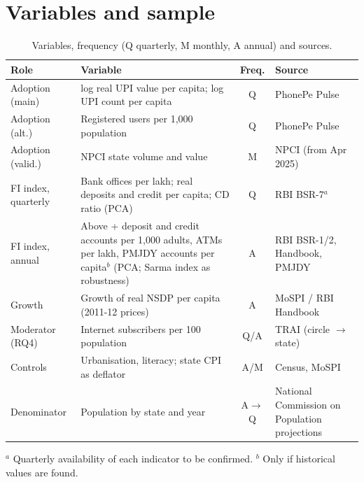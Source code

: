 \section{Variables and sample}
\begin{table}[tbp]
\centering\small
\begin{tabularx}{\textwidth}{@{}l >{\raggedright\arraybackslash}X c >{\raggedright\arraybackslash}X@{}}
\toprule
Role & Variable & Freq. & Source \\
\midrule
Adoption (main) & log real UPI value per capita; log UPI count per capita & Q & PhonePe Pulse \\
Adoption (alt.) & Registered users per 1,000 population & Q & PhonePe Pulse \\
Adoption (valid.) & NPCI state volume and value & M & NPCI (from Apr 2025) \\
FI index, quarterly & Bank offices per lakh; real deposits and credit per capita; CD ratio (PCA) & Q & RBI BSR-7$^{a}$ \\
FI index, annual & Above + deposit and credit accounts per 1,000 adults, ATMs per lakh, PMJDY accounts per capita$^{b}$ (PCA; Sarma index as robustness) & A & RBI BSR-1/2, Handbook, PMJDY \\
Growth & Growth of real NSDP per capita (2011-12 prices) & A & MoSPI / RBI Handbook \\
Moderator (RQ4) & Internet subscribers per 100 population & Q/A & TRAI (circle $\to$ state) \\
Controls & Urbanisation, literacy; state CPI as deflator & A/M & Census, MoSPI \\
Denominator & Population by state and year & A$\to$Q & National Commission on Population projections \\
\bottomrule
\end{tabularx}
\par\smallskip\raggedright\footnotesize
$^{a}$ Quarterly availability of each indicator to be confirmed. $^{b}$ Only if historical values are found.
\caption{Variables, frequency (Q quarterly, M monthly, A annual) and sources.}
\label{tab:variables}
\end{table}

\begin{table}[tbp]
\centering\small

\caption{Summary statistics, main sample (30 units: 28 states, Delhi, Jammu and Kashmir), 2018Q1--2026Q2. Data: PhonePe Pulse; MoSPI state CPI (linked, base 2012 $=100$); NCP 2020 population projections.}
\label{tab:summary}
\end{table}

